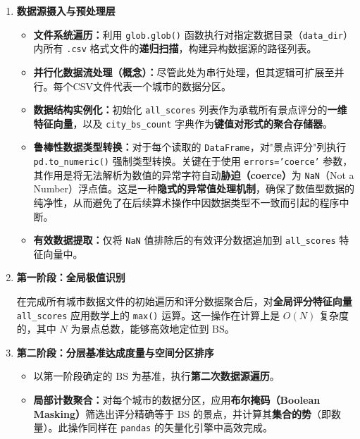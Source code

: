 \documentclass[12pt]{article}
\newcommand{\BS}{\text{BS}}
\begin{document}
\begin{enumerate}[leftmargin=*]
    \item \textbf{数据源摄入与预处理层}
    
    \begin{itemize}[leftmargin=*]
        \item \textbf{文件系统遍历：}利用 \texttt{glob.glob()} 函数执行对指定数据目录（\texttt{data\_dir}）内所有 \texttt{.csv} 格式文件的\textbf{递归扫描}，构建异构数据源的路径列表。
        
        \item \textbf{并行化数据流处理（概念）：}尽管此处为串行处理，但其逻辑可扩展至并行。每个CSV文件代表一个城市的数据分区。
        
        \item \textbf{数据结构实例化：}初始化 \texttt{all\_scores} 列表作为承载所有景点评分的\textbf{一维特征向量}，以及 \texttt{city\_bs\_count} 字典作为\textbf{键值对形式的聚合存储器}。
        
        \item \textbf{鲁棒性数据类型转换：}对于每个读取的 \texttt{DataFrame}，对"景点评分"列执行 \texttt{pd.to\_numeric()} 强制类型转换。关键在于使用 \texttt{errors='coerce'} 参数，其作用是将无法解析为数值的异常字符自动\textbf{胁迫（coerce）}为 \texttt{NaN}（Not a Number）浮点值。这是一种\textbf{隐式的异常值处理机制}，确保了数值型数据的纯净性，从而避免了在后续算术操作中因数据类型不一致而引起的程序中断。
        
        \item \textbf{有效数据提取：}仅将 \texttt{NaN} 值排除后的有效评分数据追加到 \texttt{all\_scores} 特征向量中。
    \end{itemize}

    \item \textbf{第一阶段：全局极值识别}
    
    在完成所有城市数据文件的初始遍历和评分数据聚合后，对\textbf{全局评分特征向量} \texttt{all\_scores} 应用数学上的 \texttt{max()} 运算。这一操作在计算上是 $O(N)$ 复杂度的，其中 $N$ 为景点总数，能够高效地定位到 $\BS$。

    \item \textbf{第二阶段：分层基准达成度量与空间分区排序}
    
    \begin{itemize}[leftmargin=*]
        \item 以第一阶段确定的 $\BS$ 为基准，执行\textbf{第二次数据源遍历}。
        
        \item \textbf{局部计数聚合：}对每个城市的数据分区，应用\textbf{布尔掩码（Boolean Masking）}筛选出评分精确等于 $\BS$ 的景点，并计算其\textbf{集合的势}（即数量）。此操作同样在 \texttt{pandas} 的矢量化引擎中高效完成。
        

\end{itemize}
\end{enumerate}
\end{document}
